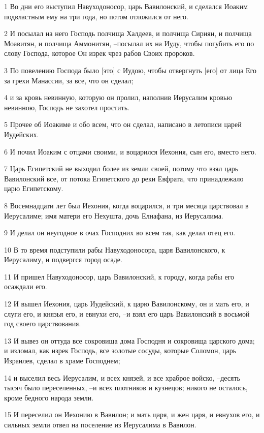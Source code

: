 \par 1 Во дни его выступил Навуходоносор, царь Вавилонский, и сделался Иоаким подвластным ему на три года, но потом отложился от него.
\par 2 И посылал на него Господь полчища Халдеев, и полчища Сириян, и полчища Моавитян, и полчища Аммонитян, --посылал их на Иуду, чтобы погубить его по слову Господа, которое Он изрек чрез рабов Своих пророков.
\par 3 По повелению Господа было [это] с Иудою, чтобы отвергнуть [его] от лица Его за грехи Манассии, за все, что он сделал;
\par 4 и за кровь невинную, которую он пролил, наполнив Иерусалим кровью невинною, Господь не захотел простить.
\par 5 Прочее об Иоакиме и обо всем, что он сделал, написано в летописи царей Иудейских.
\par 6 И почил Иоаким с отцами своими, и воцарился Иехония, сын его, вместо него.
\par 7 Царь Египетский не выходил более из земли своей, потому что взял царь Вавилонский все, от потока Египетского до реки Евфрата, что принадлежало царю Египетскому.
\par 8 Восемнадцати лет был Иехония, когда воцарился, и три месяца царствовал в Иерусалиме; имя матери его Нехушта, дочь Елнафана, из Иерусалима.
\par 9 И делал он неугодное в очах Господних во всем так, как делал отец его.
\par 10 В то время подступили рабы Навуходоносора, царя Вавилонского, к Иерусалиму, и подвергся город осаде.
\par 11 И пришел Навуходоносор, царь Вавилонский, к городу, когда рабы его осаждали его.
\par 12 И вышел Иехония, царь Иудейский, к царю Вавилонскому, он и мать его, и слуги его, и князья его, и евнухи его, --и взял его царь Вавилонский в восьмой год своего царствования.
\par 13 И вывез он оттуда все сокровища дома Господня и сокровища царского дома; и изломал, как изрек Господь, все золотые сосуды, которые Соломон, царь Израилев, сделал в храме Господнем;
\par 14 и выселил весь Иерусалим, и всех князей, и все храброе войско, --десять тысяч было переселенных, --и всех плотников и кузнецов; никого не осталось, кроме бедного народа земли.
\par 15 И переселил он Иехонию в Вавилон; и мать царя, и жен царя, и евнухов его, и сильных земли отвел на поселение из Иерусалима в Вавилон.

